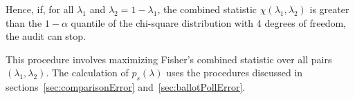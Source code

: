 Hence, if, for all $\lambda_1$ and $\lambda_2 = 1- \lambda_1$,
the combined statistic $\chi(\lambda_1, \lambda_2)$ is greater than the 
$1-\alpha$ quantile of the chi-square
distribution with 4 degrees of freedom, the audit can stop.

This procedure involves maximizing Fisher's combined statistic over all pairs $(\lambda_1, \lambda_2)$.
The calculation of $p_s(\lambda)$ uses the procedures discussed in 
sections~\ref{sec:comparisonError} and~\ref{sec:ballotPollError}.
